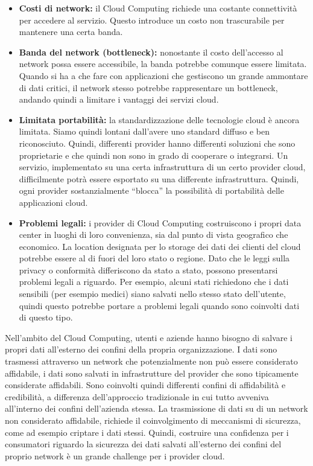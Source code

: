 \documentclass{article}
\begin{document}
\begin{itemize}
    \item \textbf{Costi di network:} il Cloud Computing richiede una costante connettività per accedere al servizio. Questo introduce un costo non trascurabile per mantenere una certa banda.
    \item \textbf{Banda del network (bottleneck):} nonostante il costo dell’accesso al network possa essere accessibile, la banda potrebbe comunque essere limitata. Quando si ha a che fare con applicazioni che gestiscono un grande ammontare di dati critici, il network stesso potrebbe rappresentare un bottleneck, andando quindi a limitare i vantaggi dei servizi cloud.
    \item \textbf{Limitata portabilità:} la standardizzazione delle tecnologie cloud è ancora limitata. Siamo quindi lontani dall’avere uno standard diffuso e ben riconosciuto. Quindi, differenti provider hanno differenti soluzioni che sono proprietarie e che quindi non sono in grado di cooperare o integrarsi. Un servizio, implementato su una certa infrastruttura di un certo provider cloud, difficilmente potrà essere esportato su una differente infrastruttura. Quindi, ogni provider sostanzialmente “blocca” la possibilità di portabilità delle applicazioni cloud. 
    \item \textbf{Problemi legali:} i provider di Cloud Computing costruiscono i propri data center in luoghi di loro convenienza, sia dal punto di vista geografico che economico. La location designata per lo storage dei dati dei clienti del cloud potrebbe essere al di fuori del loro stato o regione. Dato che le leggi sulla privacy o conformità differiscono da stato a stato, possono presentarsi problemi legali a riguardo. Per esempio, alcuni stati richiedono che i dati sensibili (per esempio medici) siano salvati nello stesso stato dell’utente, quindi questo potrebbe portare a problemi legali quando sono coinvolti dati di questo tipo.
\end{itemize}
Nell’ambito del Cloud Computing, utenti e aziende hanno bisogno di salvare i propri dati all’esterno dei confini della propria organizzazione. I dati sono trasmessi attraverso un network che potenzialmente non può essere considerato affidabile, i dati sono salvati in infrastrutture del provider che sono tipicamente considerate affidabili. Sono coinvolti quindi differenti confini di affidabilità e credibilità, a differenza dell’approccio tradizionale in cui tutto avveniva all’interno dei confini dell’azienda stessa. La trasmissione di dati su di un network non considerato affidabile, richiede il coinvolgimento di meccanismi di sicurezza, come ad esempio criptare i dati stessi. Quindi, costruire una confidenza per i consumatori riguardo la sicurezza dei dati salvati all’esterno dei confini del proprio network è un grande challenge per i provider cloud.  
\end{document}
